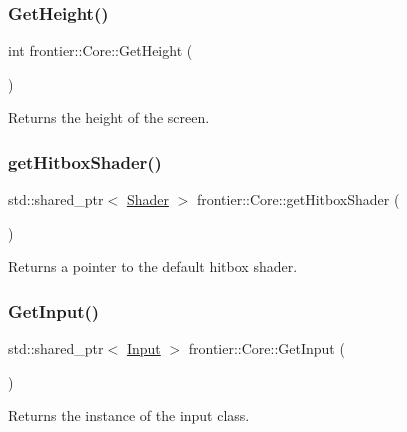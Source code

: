 \subsubsection{\texorpdfstring{Get\+Height()}{GetHeight()}}
{\footnotesize\ttfamily int frontier\+::\+Core\+::\+Get\+Height (\begin{DoxyParamCaption}{ }\end{DoxyParamCaption})}



Returns the height of the screen. 

\mbox{\label{classfrontier_1_1_core_a5c92add403b305f061f691d9c21d63c0}} 
\subsubsection{\texorpdfstring{get\+Hitbox\+Shader()}{getHitboxShader()}}
{\footnotesize\ttfamily std\+::shared\+\_\+ptr$<$ \hyperlink{classfrontier_1_1_shader}{Shader} $>$ frontier\+::\+Core\+::get\+Hitbox\+Shader (\begin{DoxyParamCaption}{ }\end{DoxyParamCaption})}



Returns a pointer to the default hitbox shader. 

\mbox{\label{classfrontier_1_1_core_a4098db42dc9ad76fb1b7f579cea45bd2}} 
\subsubsection{\texorpdfstring{Get\+Input()}{GetInput()}}
{\footnotesize\ttfamily std\+::shared\+\_\+ptr$<$ \hyperlink{classfrontier_1_1_input}{Input} $>$ frontier\+::\+Core\+::\+Get\+Input (\begin{DoxyParamCaption}{ }\end{DoxyParamCaption})}



Returns the instance of the input class. 

\mbox{\label{classfrontier_1_1_core_a78b3939fe11820a0c041c984a25107b3}} 
